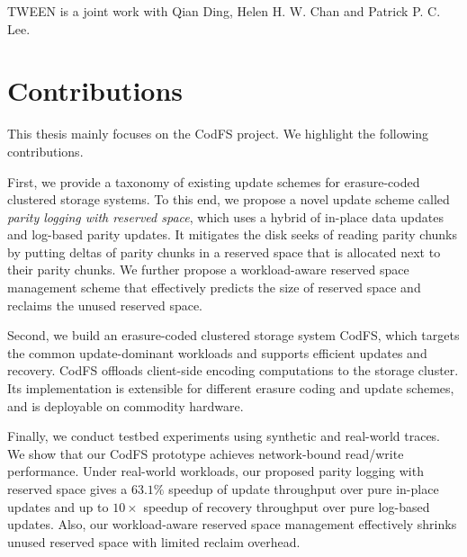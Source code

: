TWEEN is a joint work with Qian Ding, Helen H. W. Chan and Patrick P. C. Lee.

\section{Contributions}

This thesis mainly focuses on the CodFS project. We highlight the following
contributions.

First, we provide a taxonomy of existing update schemes for
erasure-coded clustered storage systems.  To this end, we propose a novel
update scheme called {\em parity logging with reserved space}, which
uses a hybrid of in-place data updates and log-based parity updates.  It
mitigates the disk seeks of reading parity chunks by putting deltas of parity
chunks in a reserved space that is allocated next to their parity chunks.  We
further propose a workload-aware reserved space management scheme that
effectively predicts the size of reserved space and reclaims the unused
reserved space. 

Second, we build an erasure-coded clustered storage system CodFS, which
targets the common update-dominant workloads and supports efficient updates
and recovery.   CodFS offloads client-side encoding computations to the
storage cluster.  
Its implementation is extensible for different erasure coding and update
schemes, and is deployable on commodity hardware. 

Finally, we conduct testbed experiments using synthetic and real-world traces.
We show that our CodFS prototype achieves network-bound read/write
performance.  Under real-world workloads, our proposed parity logging with
reserved space gives a ${63.1}\%$ speedup of update throughput over pure
in-place updates and up to ${10\times}$ speedup of recovery throughput over
pure log-based updates.  Also, our workload-aware reserved space management
effectively shrinks unused reserved space with limited reclaim overhead. 



